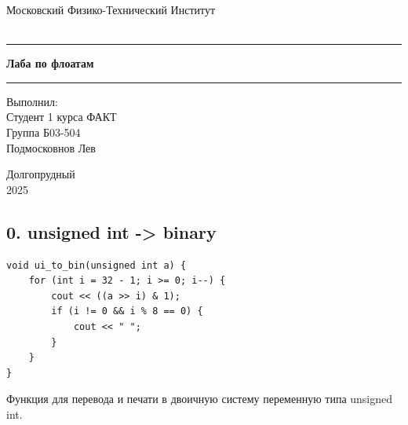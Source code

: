\documentclass[a4paper, 12pt]{article}
\begin{document}
\begin{titlepage}
    
    \begin{center}
        \vspace*{5cm}
        \Huge Московский Физико-Технический Институт
        \vspace*{2cm}\\
        \\\vspace*{0.25cm}
        
        \noindent\rule{\textwidth}{1pt}
        \vspace*{-0.25cm}
        
        \huge \textbf{Лаба по флоатам}
        \noindent\rule{\textwidth}{1pt}

        \vspace{6cm}
       \vfill
        \begin{flushright}
            \begin{minipage}{.4\textwidth}
            \Large Выполнил:\\ Студент 1 курса ФАКТ\\ Группа Б03-504 \\Подмосковнов Лев\\
            \end{minipage}
        \end{flushright}
        
        \vfill
        \normalsize Долгопрудный \\2025
        
    \end{center}
\end{titlepage}
\restoregeometry

\setcounter{page}{2}

\subsection*{0. unsigned int -> binary}

\begin{lstlisting}
void ui_to_bin(unsigned int a) {
    for (int i = 32 - 1; i >= 0; i--) {
        cout << ((a >> i) & 1);
        if (i != 0 && i % 8 == 0) {
            cout << " ";
        }
    }
}
\end{lstlisting}



Функция для перевода и печати в двоичную систему переменную типа unsigned int.
\end{document}
